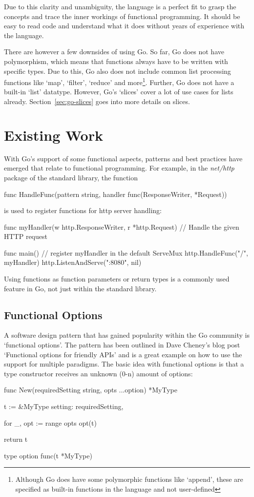 Due to this clarity and unambiguity, the language is a perfect fit to grasp the concepts and trace
the inner workings of functional programming. It should be easy to read code and understand what
it does without years of experience with the language.

There are however a few downsides of using Go. So far, Go does not have polymorphism, which means
that functions always have to be written with specific types. Due to this, Go also does not include
common list processing functions like `map', `filter', `reduce' and more\footnote{Although Go does
	have some polymorphic functions like `append', these are specified as built-in functions in the
language and not user-defined}. Further, Go does not have a built-in `list' datatype. However, Go's
`slices' cover a lot of use cases for lists already. Section~\ref{sec:go-slices} goes into more
details on slices.

\section{Existing Work}

With Go's support of some functional aspects, patterns and best practices have emerged that relate
to functional programming.
For example, in the \textit{net/http} package of the standard library, the function
\begin{gocode}
func HandleFunc(pattern string, handler func(ResponseWriter, *Request))
\end{gocode}
is used to register functions for http server handling:

\begin{gocode}
func myHandler(w http.ResponseWriter, r *http.Request) {
    // Handle the given HTTP request
}

func main() {
    // register myHandler in the default ServeMux
    http.HandleFunc("/", myHandler)
    http.ListenAndServe(":8080", nil)
}
\end{gocode}
\autocite{go-http-doc}

Using functions as function parameters or return types is a commonly used feature in Go, not just
within the standard library.

\subsection{Functional Options}

A software design pattern that has gained popularity within the Go community is `functional options'.
The pattern has been outlined in Dave Cheney's blog post `Functional options for friendly APIs'
and is a great example on how to use the support for multiple paradigms.
The basic idea with functional options is that a type constructor receives an unknown (0-n) amount
of options:
\begin{gocode}
func New(requiredSetting string, opts ...option) *MyType {
	t := &MyType{
		setting: requiredSetting,
	}

	for _, opt := range opts {
		opt(t)
	}

	return t
}

type option func(t *MyType)
\end{gocode}


